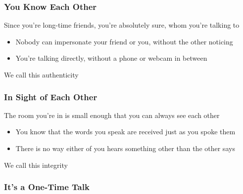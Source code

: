 \documentclass[
	aspectratio=169,
	xetex,
]{beamer}
\begin{document}
\begin{frame}
	\frametitle{You Know Each Other}
	Since you're long-time friends, you're absolutely sure, whom you're talking to
	\begin{itemize}
		\item Nobody can impersonate your friend or you, without the other noticing
		\item You're talking directly, without a phone or webcam in between
	\end{itemize}
	We call this \alert{authenticity}
\end{frame}

\begin{frame}
	\frametitle{In Sight of Each Other}
	The room you're in is small enough that you can always see each other
	\begin{itemize}
		\item You know that the words you speak are received just as you spoke them
		\item There is no way either of you hears something other than the other says
	\end{itemize}
	We call this \alert{integrity}
\end{frame}

\begin{frame}
	\frametitle{It's a One-Time Talk}
\end{frame}
\end{document}
